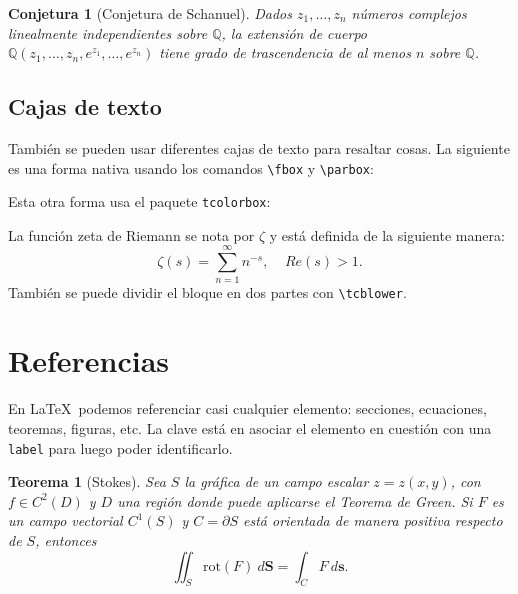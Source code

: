 \documentclass[12pt, spanish]{article}
\theoremstyle{definition} %
\theoremstyle{remark} %
\providecommand{\theoremname}{Teorema}
\theoremstyle{plain} %
\newtheorem{thm}[defn]{\protect\theoremname}
\theoremstyle{plain} %
\theoremstyle{plain} %
\theoremstyle{plain} %
\providecommand{\conjecturename}{Conjetura}
\theoremstyle{plain} %
\newtheorem*{conjecture}{\protect\conjecturename}
\theoremstyle{remark} %
\newcommand{\re}[1]{Re(#1)} %
\begin{document}
\begin{conjecture}[Conjetura de Schanuel]
    Dados $z_1, \dots, z_n$ números complejos linealmente independientes sobre $\mathbb{Q}$, la extensión de cuerpo $\mathbb{Q}(z_1, \dots, z_n, e^{z_1}, \dots, e^{z_n})$ tiene grado de trascendencia de al menos $n$ sobre $\mathbb{Q}$.
\end{conjecture}

\subsection{Cajas de texto}

También se pueden usar diferentes cajas de texto para resaltar cosas. La siguiente es una forma nativa usando los comandos \verb|\fbox| y \verb|\parbox|:

\begin{center}
    \noindent{}
\end{center}
Esta otra forma usa el paquete \verb|tcolorbox|:

\begin{tcolorbox}[
    colback=white, %
    colframe=teal, %
    title=Función zeta de Riemann %
]
La función zeta de Riemann se nota por $\zeta$ y está definida de la siguiente manera:
\[
    \zeta(s) = \sum_{n=1}^\infty n^{-s},\;\;\;\; \re{s}>1.
\]
\tcblower
También se puede dividir el bloque en dos partes con \verb|\tcblower|.
\end{tcolorbox}




\section{Referencias}

En \LaTeX\ podemos referenciar casi cualquier elemento: secciones, ecuaciones, teoremas, figuras, etc. La clave está en asociar el elemento en cuestión con una \verb|label| para luego poder identificarlo.

\begin{thm}[Stokes]\label{teorema:stokes}
    Sea $S$ la gráfica de un campo escalar $z=z(x,y)$, con $f\in C^{2}(D)$ y $D$ una región donde puede aplicarse el Teorema de Green. Si $F$ es un campo vectorial $C^{1}(S)$ y $C=\partial S$ está orientada de manera positiva respecto de $S$, entonces 
    \begin{equation}\label{eq:formula stokes}
        \iint_{S}\text{rot}(F)\ d\boldsymbol{S}=\int_{C}F\ d\boldsymbol{s}.
    \end{equation}
\end{thm}
\end{document}
